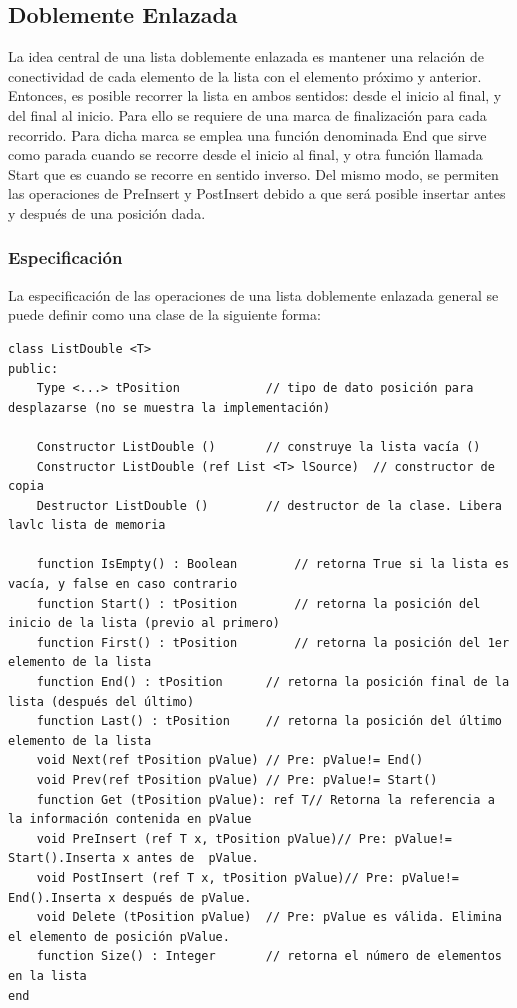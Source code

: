 \subsection{Doblemente Enlazada} \label{lb:dobleenlazada}

La idea central de una lista doblemente enlazada es mantener una relación de conectividad de cada elemento de la lista con el elemento próximo y anterior. Entonces, es posible recorrer la lista en ambos sentidos: desde el inicio al final, y del final al inicio. Para ello se requiere de una marca de finalización para cada recorrido. Para dicha marca se emplea una función denominada End que sirve como parada cuando se recorre desde el inicio al final, y otra función llamada Start que es cuando se recorre en sentido inverso. Del mismo modo, se permiten las operaciones de PreInsert y PostInsert debido a que será posible insertar antes y después de una posición dada.

\subsubsection{Especificación}

La especificación de las operaciones de una lista doblemente enlazada general se puede definir como una clase de la siguiente forma:

\begin{lstlisting}[upquote=true, language=pseudo]
class ListDouble <T>
public:
    Type <...> tPosition			// tipo de dato posición para desplazarse (no se muestra la implementación)

    Constructor ListDouble ()		// construye la lista vacía ()
    Constructor ListDouble (ref List <T> lSource)  // constructor de copia
    Destructor ListDouble ()		// destructor de la clase. Libera lavlc lista de memoria

    function IsEmpty() : Boolean		// retorna True si la lista es vacía, y false en caso contrario
    function Start() : tPosition		// retorna la posición del inicio de la lista (previo al primero)
    function First() : tPosition		// retorna la posición del 1er elemento de la lista
    function End() : tPosition		// retorna la posición final de la lista (después del último) 
    function Last() : tPosition		// retorna la posición del último elemento de la lista
    void Next(ref tPosition pValue)	// Pre: pValue!= End()
    void Prev(ref tPosition pValue)	// Pre: pValue!= Start()
    function Get (tPosition pValue): ref T// Retorna la referencia a la información contenida en pValue
    void PreInsert (ref T x, tPosition pValue)// Pre: pValue!= Start().Inserta x antes de  pValue. 
    void PostInsert (ref T x, tPosition pValue)// Pre: pValue!= End().Inserta x después de pValue. 
    void Delete (tPosition pValue)	// Pre: pValue es válida. Elimina el elemento de posición pValue.
    function Size() : Integer		// retorna el número de elementos en la lista
end
\end{lstlisting}

